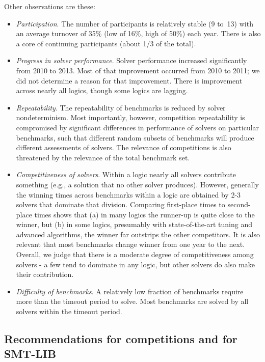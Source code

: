 \documentclass[smallcondensed]{svjour3}
\begin{document}
Other observations are these:
\begin{itemize}
\item {\em Participation}. The number of participants is relatively stable (9 to~13) with an average turnover of 35\% (low of 16\%, high of 50\%) each year. There is also a core of continuing participants (about 1/3 of the total).
\item {\em Progress in solver performance}. Solver performance increased significantly from 2010 to 2013. 
Most of that improvement occurred from 2010 to 2011; we did not determine a reason for that improvement. There is improvement across nearly all logics, though some logics are lagging.  
\item {\em Repeatability}. The repeatability of benchmarks is reduced by solver nondeterminism. Most importantly, however, competition repeatability is compromised by significant differences in performance of solvers on particular benchmarks, such that different random subsets of benchmarks will produce different assessments of solvers. The relevance of competitions is also threatened by the relevance of the total benchmark set.
\item {\em Competitiveness of solvers}. Within a logic nearly all solvers contribute something (e.g., a solution that no other solver produces). However, generally the winning times across benchmarks within a logic are obtained by 2-3 solvers that dominate that division. Comparing first-place times to second-place times shows that (a) in many logics the runner-up is quite close to the winner, but (b) in some logics, presumably with state-of-the-art tuning and advanced algorithms, the winner far outstrips the other competitors. It is also relevant that most benchmarks change winner from one year to the next. Overall, we judge that there is a moderate degree of competitiveness among solvers - a few tend to dominate in any logic, but other solvers do also make their contribution.
\item {\em Difficulty of benchmarks}. A relatively low fraction of benchmarks require more than the timeout period to solve. Most benchmarks are solved by all solvers within the timeout period.

\end{itemize}

\subsection{Recommendations for competitions and for SMT-LIB}
\end{document}

